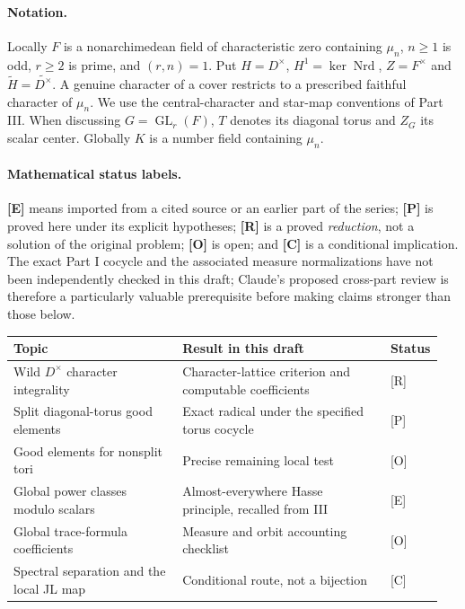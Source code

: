 \documentclass[11pt]{article}
\newcommand{\GL}{\operatorname{GL}}
\newcommand{\Nrd}{\operatorname{Nrd}}
\theoremstyle{plain}
\theoremstyle{definition}
\begin{document}
\paragraph{Notation.}
Locally $F$ is a nonarchimedean field of characteristic zero containing
$\mu_n$, $n\geq 1$ is odd, $r\geq 2$ is prime, and $(r,n)=1$.  Put
$H=D^\times$, $H^1=\ker\Nrd$, $Z=F^\times$ and
$\widetilde H=\widetilde{D^\times}$.  A genuine character of a cover
restricts to a prescribed faithful character of $\mu_n$.  We use the
central-character and star-map conventions of Part III.  When discussing
$G=\GL_r(F)$, $T$ denotes its diagonal torus and $Z_G$ its scalar
center.  Globally $K$ is a number field containing $\mu_n$.

\paragraph{Mathematical status labels.}
\textbf{[E]} means imported from a cited source or an earlier part of
the series; \textbf{[P]} is proved here under its explicit hypotheses;
\textbf{[R]} is a proved \emph{reduction}, not a solution of the original
problem; \textbf{[O]} is open; and \textbf{[C]} is a conditional
implication.  The exact Part I cocycle and the associated measure
normalizations have not been independently checked in this draft;
Claude's proposed cross-part review is therefore a particularly
valuable prerequisite before making claims stronger than those below.

\begin{center}\small
\begin{tabular}{@{}p{0.39\linewidth}p{0.48\linewidth}p{0.08\linewidth}@{}}
\toprule
Topic & Result in this draft & Status\\\midrule
Wild $D^\times$ character integrality & Character-lattice criterion and computable coefficients & [R]\\
Split diagonal-torus good elements & Exact radical under the specified torus cocycle & [P]\\
Good elements for nonsplit tori & Precise remaining local test & [O]\\
Global power classes modulo scalars & Almost-everywhere Hasse principle, recalled from III & [E]\\
Global trace-formula coefficients & Measure and orbit accounting checklist & [O]\\
Spectral separation and the local JL map & Conditional route, not a bijection & [C]\\
\bottomrule
\end{tabular}
\end{center}
\end{document}
